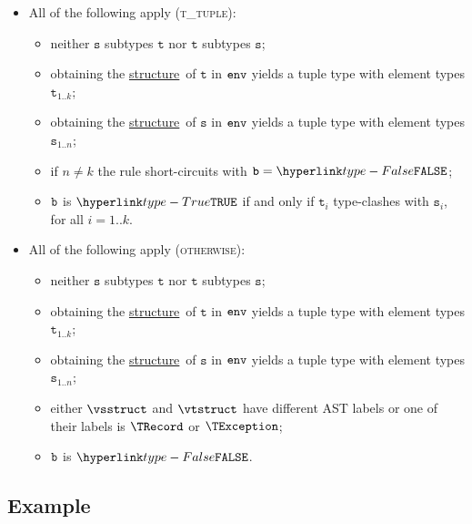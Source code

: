 \documentclass{book}
\newcommand\structure[0]{\hyperlink{def-structure}{structure}}
\newcommand\vt[0]{\texttt{t}}
\newcommand\vs[0]{\texttt{s}}
\begin{document}
\begin{itemize}
  \item All of the following apply (\textsc{t\_tuple}):
  \begin{itemize}
    \item neither $\vs$ subtypes $\vt$ nor $\vt$ subtypes $\vs$;
    \item obtaining the \structure\ of $\vt$ in $\texttt{env}$ yields a tuple type with element types $\vt_{1..k}$;
    \item obtaining the \structure\ of $\vs$ in $\texttt{env}$ yields a tuple type with element types $\vs_{1..n}$;
    \item if $n \neq k$ the rule short-circuits with $\vb=\False$;
    \item $\texttt{b}$ is $\True$ if and only if $\vt_i$ type-clashes with $\vs_i$, for all $i=1..k$.
  \end{itemize}

  \item All of the following apply (\textsc{otherwise}):
  \begin{itemize}
    \item neither $\vs$ subtypes $\vt$ nor $\vt$ subtypes $\vs$;
    \item obtaining the \structure\ of $\vt$ in $\texttt{env}$ yields a tuple type with element types $\vt_{1..k}$;
    \item obtaining the \structure\ of $\vs$ in $\texttt{env}$ yields a tuple type with element types $\vs_{1..n}$;
    \item either $\vsstruct$ and $\vtstruct$ have different AST labels or one of their labels
    is $\TRecord$ or $\TException$;
    \item $\texttt{b}$ is $\False$.
  \end{itemize}
\end{itemize}

\subsection{Example}

\end{document}
